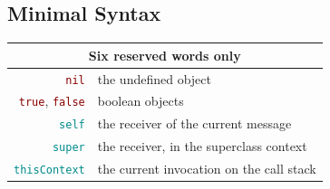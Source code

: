 \documentclass[notumble]{leaflet}
\newcommand{\code}[1]{\foreignlanguage{english}{\texttt{#1}}}
\begin{document}


\subsection{Minimal Syntax}
\noindent
\begin{tabularx}{\linewidth}{@{}rX@{}}
        \toprule
        \multicolumn{2}{c}{Six reserved words only}\\
        \midrule
        \textcolor{darkRed}{\code{nil}} & the undefined object\\
        \textcolor{darkRed}{\code{true}}, \textcolor{darkRed}{\code{false}} & boolean objects\\
        \textcolor{darkCyan}{\code{self}} & the receiver of the current message\\
        \textcolor{darkCyan}{\code{super}} & the receiver, in the superclass context\\
        \textcolor{darkCyan}{\code{thisContext}} & the current invocation on the call stack\\
\end{tabularx}
\end{document}
